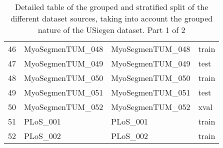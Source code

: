 \begin{SCtable}[\sidecaptionrelwidth][h]
\begin{tabular}{l m{4cm} m{4cm} l}
        46  &  MyoSegmenTUM\_048 &  MyoSegmenTUM\_048 &  train \\
        47  &  MyoSegmenTUM\_049 &  MyoSegmenTUM\_049 &   test \\
        48  &  MyoSegmenTUM\_050 &  MyoSegmenTUM\_050 &  train \\
        49  &  MyoSegmenTUM\_051 &  MyoSegmenTUM\_051 &   test \\
        50  &  MyoSegmenTUM\_052 &  MyoSegmenTUM\_052 &   xval \\
        51  &          PLoS\_001 &          PLoS\_001 &  train \\
        52  &          PLoS\_002 &          PLoS\_002 &  train \\
        \bottomrule
    \end{tabular}
    \caption{Detailed table of the grouped and stratified split of the different dataset sources, taking into account the grouped nature of the USiegen dataset. Part 1 of 2}
  
  \end{SCtable}

